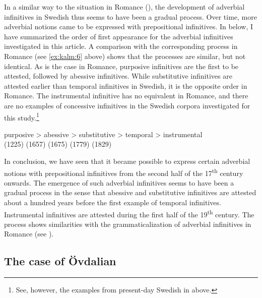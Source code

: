 \documentclass[output=paper]{langscibook}
\begin{document}
In a similar way to the situation in Romance (\citealt{Schulte2007Prepositional,Schulte2007What}), the development of adverbial infinitives in Swedish thus seems to have been a gradual process. Over time, more adverbial notions came to be expressed with prepositional infinitives. In  below, I have summarized the order of first appearance for the adverbial infinitives investigated in this article. A comparison with the corresponding process in Romance (see \ref{ex:kalm:6} above) shows that the processes are similar, but not identical. As is the case in Romance, purposive infinitives are the first to be attested, followed by abessive infinitives. While substitutive infinitives are attested earlier than temporal infinitives in Swedish, it is the opposite order in Romance. The instrumental infinitive has no equivalent in Romance, and there are no examples of concessive infinitives in the Swedish corpora investigated for this study.\footnote{See, however, the examples from present-day Swedish in  above.}     

\ea  \label{ex:kalm:14}
\gll purposive >  abessive  > substitutive > temporal > instrumental\\
(1225) {} (1657) {} (1675) {} (1779) {} (1829)\\
\z 



In conclusion, we have seen that it became possible to express certain adverbial notions with prepositional infinitives from the second half of the 17\textsuperscript{th} century onwards. The emergence of such adverbial infinitives seems to have been a gradual process in the sense that abessive and substitutive infinitives are attested about a hundred years before the first example of temporal infinitives. Instrumental infinitives are attested during the first half of the 19\textsuperscript{th} century. The process shows similarities with the grammaticalization of adverbial infinitives in Romance (see \citealt{Schulte2007Prepositional,Schulte2007What}). 


\subsection{The case of Övdalian}\label{sec:kalm:4.3}
\end{document}
